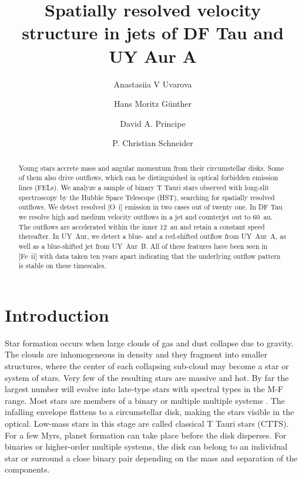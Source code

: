 \documentclass[twocolumn,trackchanges]{aastex63}
\begin{document}
\title{Spatially resolved velocity structure in jets of DF Tau and UY Aur A}



\author{Anastasiia V Uvarova}

\author[0000-0003-4243-2840]{Hans Moritz G\"unther}

\author{David A. Principe}

\author{P. Christian Schneider}

\begin{abstract}
Young stars accrete mass and angular momentum from their circumstellar
disks. Some of them also drive outflows, which can be distinguished in
optical forbidden emission lines (FELs). We analyze a sample of binary
T Tauri stars observed with long-slit spectroscopy by the Hubble Space
Telescope (HST), searching for spatially resolved outflows. We detect resolved [O~{\sc i}] emission in two cases out of twenty one. In DF Tau we resolve high and medium velocity outflows in a jet and counterjet out to 60~au. The outflows are accelerated within the inner 12~au and retain a constant speed thereafter. In UY~Aur, we detect a blue- and a red-shifted outflow from UY~Aur~A, as well as a blue-shifted jet from UY~Aur~B. All of these features have been seen in [Fe~{\sc ii}] with data taken ten years apart indicating that the underlying outflow pattern is stable on these timescales.
\end{abstract}%


\section{Introduction}
\label{sect:intro}
Star formation occurs when large clouds of gas and dust collapse due to
gravity. The clouds are inhomogeneous in density and they fragment into
smaller structures, where the center of each collapsing sub-cloud may
become a star or system of stars. Very few of the resulting stars are
massive and hot. By far the largest number will evolve into late-type
stars with spectral types in the M-F range. Most stars are members of a binary or multiple multiple systems \citep[see e.g.\ review by][]{2007prpl.conf..379D}.
The infalling envelope
flattens to a circumstellar disk, making the stars visible in the
optical. Low-mass stars in this stage are called classical T Tauri stars
(CTTS). For a few Myrs, planet formation can take place before the disk
disperses. For binaries or higher-order multiple systems, the disk can
belong to an individual star or surround a close binary pair depending
on the mass and separation of the components.
\end{document}
